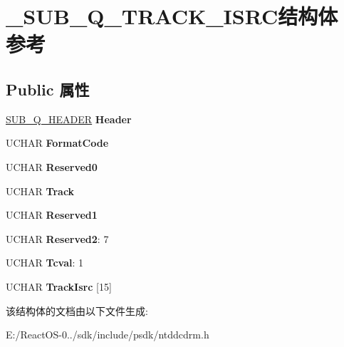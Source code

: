 \hypertarget{struct___s_u_b___q___t_r_a_c_k___i_s_r_c}{}\section{\+\_\+\+S\+U\+B\+\_\+\+Q\+\_\+\+T\+R\+A\+C\+K\+\_\+\+I\+S\+R\+C结构体 参考}
\label{struct___s_u_b___q___t_r_a_c_k___i_s_r_c}
\subsection*{Public 属性}
\begin{DoxyCompactItemize}
\item 
\mbox{\label{struct___s_u_b___q___t_r_a_c_k___i_s_r_c_ab98b5033fdb275826c9994cbb8e1d188}} 
\hyperlink{struct___s_u_b___q___h_e_a_d_e_r}{S\+U\+B\+\_\+\+Q\+\_\+\+H\+E\+A\+D\+ER} {\bfseries Header}
\item 
\mbox{\label{struct___s_u_b___q___t_r_a_c_k___i_s_r_c_ae1339b9d44ec6394112e94d31d79cab8}} 
U\+C\+H\+AR {\bfseries Format\+Code}
\item 
\mbox{\label{struct___s_u_b___q___t_r_a_c_k___i_s_r_c_ae9cb257db80f66c8a105c13308b70612}} 
U\+C\+H\+AR {\bfseries Reserved0}
\item 
\mbox{\label{struct___s_u_b___q___t_r_a_c_k___i_s_r_c_a572608eaf70645bec4e498bcb0bf2e18}} 
U\+C\+H\+AR {\bfseries Track}
\item 
\mbox{\label{struct___s_u_b___q___t_r_a_c_k___i_s_r_c_ac31cbabff46a4e8afa741f78ef55931f}} 
U\+C\+H\+AR {\bfseries Reserved1}
\item 
\mbox{\label{struct___s_u_b___q___t_r_a_c_k___i_s_r_c_a9dbaae230f9a5da498a48253de21af82}} 
U\+C\+H\+AR {\bfseries Reserved2}\+: 7
\item 
\mbox{\label{struct___s_u_b___q___t_r_a_c_k___i_s_r_c_acce951978eb307a73b28f1e7d2eb2732}} 
U\+C\+H\+AR {\bfseries Tcval}\+: 1
\item 
\mbox{\label{struct___s_u_b___q___t_r_a_c_k___i_s_r_c_ac0c9431cde1a17688ed8cc34d90f4d9c}} 
U\+C\+H\+AR {\bfseries Track\+Isrc} \mbox{[}15\mbox{]}
\end{DoxyCompactItemize}


该结构体的文档由以下文件生成\+:\begin{DoxyCompactItemize}
\item 
E\+:/\+React\+O\+S-\/0../sdk/include/psdk/ntddcdrm.\+h\end{DoxyCompactItemize}
